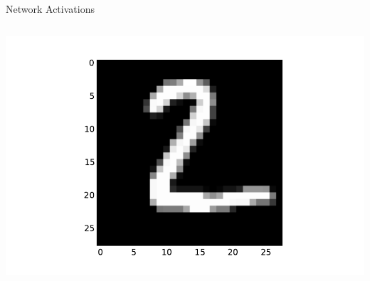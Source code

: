 \documentclass[10pt, aspectratio=169]{beamer} %
\begin{document}
\begin{frame}[fragile]{Network Activations}
\begin{columns}
\includegraphics[width=\textwidth]{keras_l1_input_2.pdf}\\

\end{columns}
\end{frame}
\end{document}
